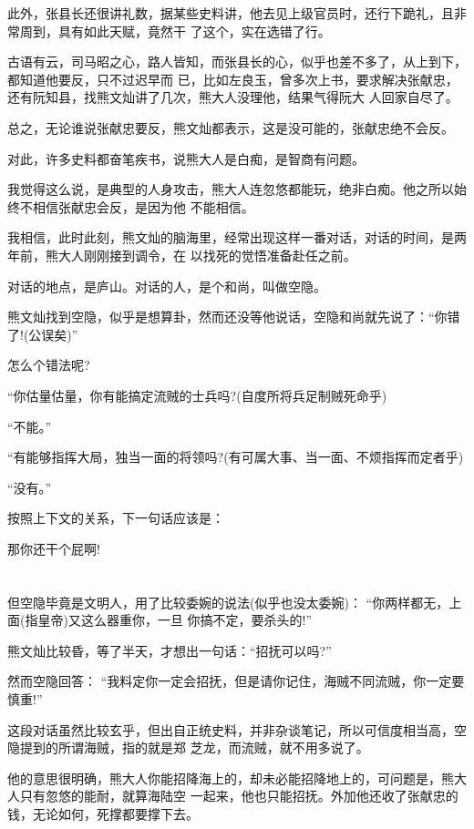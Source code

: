 \documentclass[11pt,a4paper,onecolumn]{article}
\begin{document}
此外，张县长还很讲礼数，据某些史料讲，他去见上级官员时，还行下跪礼，且非常周到，具有如此天赋，竟然干
了这个，实在选错了行。

古语有云，司马昭之心，路人皆知，而张县长的心，似乎也差不多了，从上到下，都知道他要反，只不过迟早而
已，比如左良玉，曾多次上书，要求解决张献忠，还有阮知县，找熊文灿讲了几次，熊大人没理他，结果气得阮大
人回家自尽了。

总之，无论谁说张献忠要反，熊文灿都表示，这是没可能的，张献忠绝不会反。

对此，许多史料都奋笔疾书，说熊大人是白痴，是智商有问题。

我觉得这么说，是典型的人身攻击，熊大人连忽悠都能玩，绝非白痴。他之所以始终不相信张献忠会反，是因为他
不能相信。

我相信，此时此刻，熊文灿的脑海里，经常出现这样一番对话，对话的时间，是两年前，熊大人刚刚接到调令，在
以找死的觉悟准备赴任之前。

对话的地点，是庐山。对话的人，是个和尚，叫做空隐。

熊文灿找到空隐，似乎是想算卦，然而还没等他说话，空隐和尚就先说了：``你错了!(公误矣)''

怎么个错法呢?

``你估量估量，你有能搞定流贼的士兵吗?(自度所将兵足制贼死命乎)

``不能。''

``有能够指挥大局，独当一面的将领吗?(有可属大事、当一面、不烦指挥而定者乎)

``没有。''

按照上下文的关系，下一句话应该是：

那你还干个屁啊!

\section[\thesection]{}

但空隐毕竟是文明人，用了比较委婉的说法(似乎也没太委婉)： ``你两样都无，上面(指皇帝)又这么器重你，一旦
你搞不定，要杀头的!''

熊文灿比较昏，等了半天，才想出一句话：``招抚可以吗?''

然而空隐回答： ``我料定你一定会招抚，但是请你记住，海贼不同流贼，你一定要慎重!''

这段对话虽然比较玄乎，但出自正统史料，并非杂谈笔记，所以可信度相当高，空隐提到的所谓海贼，指的就是郑
芝龙，而流贼，就不用多说了。

他的意思很明确，熊大人你能招降海上的，却未必能招降地上的，可问题是，熊大人只有忽悠的能耐，就算海陆空
一起来，他也只能招抚。外加他还收了张献忠的钱，无论如何，死撑都要撑下去。
\end{document}
